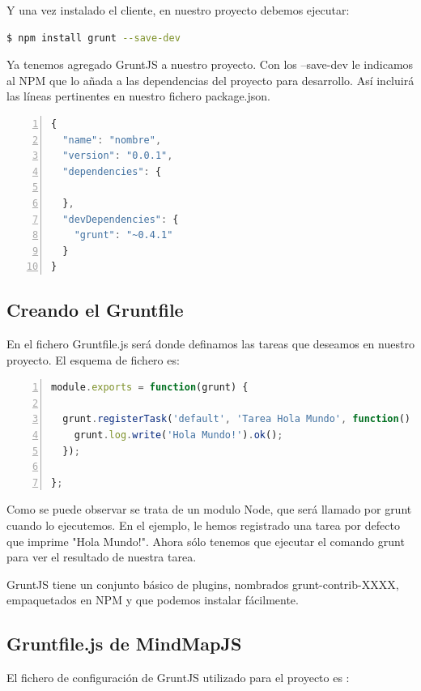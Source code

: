 Y una vez instalado el cliente, en nuestro proyecto debemos ejecutar:

\begin{lstlisting}[language=bash, numbers=none]
$ npm install grunt --save-dev
\end{lstlisting}

Ya tenemos agregado GruntJS a nuestro proyecto. Con los --save-dev le indicamos al NPM que lo añada a las dependencias del proyecto para desarrollo. Así incluirá las líneas pertinentes en nuestro fichero package.json.

\begin{lstlisting}[language=JavaScript, numbers=left]
{
  "name": "nombre",
  "version": "0.0.1",
  "dependencies": { 
 
  },
  "devDependencies": {
    "grunt": "~0.4.1"
  }
}
\end{lstlisting}


\subsection{Creando el Gruntfile}
En el fichero Gruntfile.js será donde definamos las tareas que deseamos en nuestro proyecto. El esquema de fichero es:

\begin{lstlisting}[language=JavaScript, numbers=left]
module.exports = function(grunt) {
 
  grunt.registerTask('default', 'Tarea Hola Mundo', function() {
    grunt.log.write('Hola Mundo!').ok();
  });
 
};
\end{lstlisting}

Como se puede observar se trata de un modulo Node, que será llamado por grunt cuando lo ejecutemos. En el ejemplo, le hemos registrado una tarea por defecto que imprime "Hola Mundo!". Ahora sólo tenemos que ejecutar el comando grunt para ver el resultado de nuestra tarea.

GruntJS tiene un conjunto básico de plugins, nombrados grunt-contrib-XXXX, empaquetados en NPM y que podemos instalar fácilmente. 

\subsection{Gruntfile.js de MindMapJS}

El fichero de configuración de GruntJS utilizado para el proyecto es :



